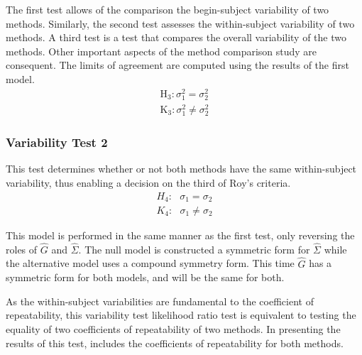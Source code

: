 \documentclass[12pt, a4paper]{report}
\theoremstyle{plain}
\theoremstyle{definition}
\theoremstyle{remark}
\begin{document}
	
	
	The first test allows of the comparison the begin-subject variability of two methods. Similarly, the second test assesses the within-subject variability of two methods. A third test is a test that compares the overall variability of the two methods. Other important aspects of the method comparison study are consequent. The limits of agreement are computed using the results of the first model.
	\begin{eqnarray*}
		\operatorname{H_3} : \sigma^2_1 = \sigma^2_2 \\
		\operatorname{K_3} : \sigma^2_1 \neq \sigma^2_2
	\end{eqnarray*}
	
	\subsubsection{Variability Test 2}
	
	This test determines whether or not both methods have the same within-subject variability, thus enabling a decision on the third of Roy's criteria.
	\begin{eqnarray*}
		H_{4}: \mbox{ }\sigma_{1}  = \sigma_{2} \\
		K_{4}: \mbox{ }\sigma_{1}  \neq \sigma_{2}
	\end{eqnarray*}
	
	This model is performed in the same manner as the first test, only reversing the roles of ${\hat{G}}$ and ${\hat{\Sigma}}$. The null model is constructed a symmetric form for ${\hat{\Sigma}}$ while the alternative model uses a compound symmetry form. This time ${\hat{G}}$ has a symmetric form for both models, and will be the same for both.
	
	As the within-subject variabilities are fundamental to the coefficient of repeatability, this variability test likelihood ratio test is equivalent to testing the equality of two coefficients of repeatability of two methods. In presenting the results of this test, \citet{ARoy2009} includes the coefficients of repeatability for both methods.
	
\end{document}

